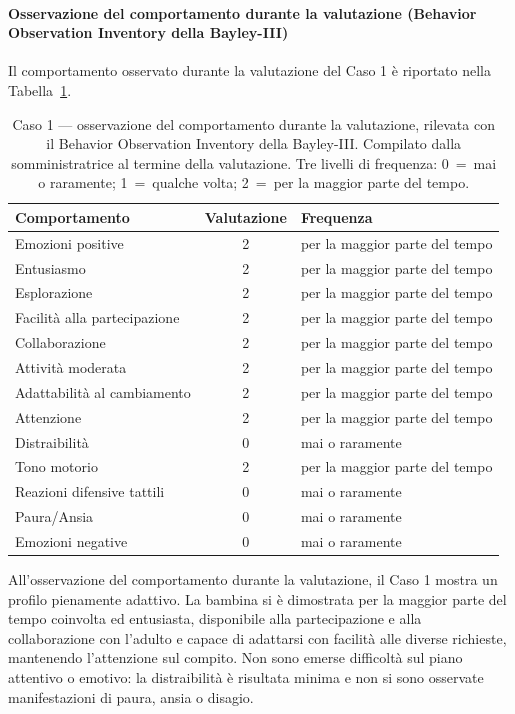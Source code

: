  \paragraph*{Osservazione del comportamento durante la valutazione (Behavior Observation Inventory della Bayley-III)}

Il comportamento osservato durante la valutazione del Caso 1 è riportato nella Tabella~\ref{tab:caso1_boi}.

\begin{table}[htbp]
\centering
\caption[Caso 1 --- osservazione del comportamento durante la valutazione]{Caso 1 --- osservazione del comportamento durante la valutazione, rilevata con il Behavior Observation Inventory della Bayley-III. Compilato dalla somministratrice al termine della valutazione. Tre livelli di frequenza: 0~=~mai o raramente; 1~=~qualche volta; 2~=~per la maggior parte del tempo.}
\label{tab:caso1_boi}
\begin{tabular}{|l|c|l|}
\toprule
\textbf{Comportamento} & \textbf{Valutazione} & \textbf{Frequenza} \\
\midrule
Emozioni positive & 2 & per la maggior parte del tempo \\
Entusiasmo & 2 & per la maggior parte del tempo \\
Esplorazione & 2 & per la maggior parte del tempo \\
Facilità alla partecipazione & 2 & per la maggior parte del tempo \\
Collaborazione & 2 & per la maggior parte del tempo \\
Attività moderata & 2 & per la maggior parte del tempo \\
Adattabilità al cambiamento & 2 & per la maggior parte del tempo \\
Attenzione & 2 & per la maggior parte del tempo \\
Distraibilità & 0 & mai o raramente \\
Tono motorio & 2 & per la maggior parte del tempo \\
Reazioni difensive tattili & 0 & mai o raramente \\
Paura/Ansia & 0 & mai o raramente \\
Emozioni negative & 0 & mai o raramente \\
\bottomrule
\end{tabular}
\end{table}

All'osservazione del comportamento durante la valutazione, il Caso 1 mostra un profilo pienamente adattivo. La bambina si è dimostrata per la maggior parte del tempo coinvolta ed entusiasta, disponibile alla partecipazione e alla collaborazione con l'adulto e capace di adattarsi con facilità alle diverse richieste, mantenendo l'attenzione sul compito. Non sono emerse difficoltà sul piano attentivo o emotivo: la distraibilità è risultata minima e non si sono osservate manifestazioni di paura, ansia o disagio.

